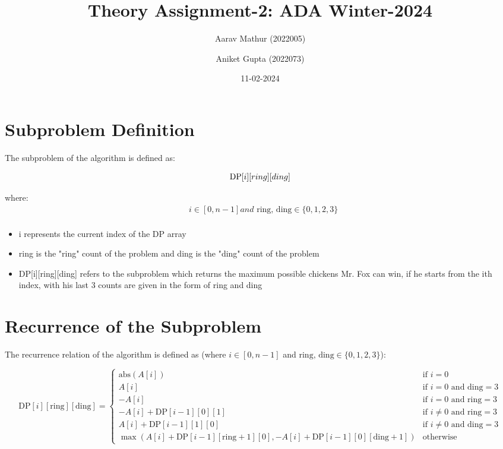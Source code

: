 \documentclass{article}
\title{Theory Assignment-2: ADA Winter-2024}
\author{Aarav Mathur (2022005) \and Aniket Gupta (2022073)}
\date{11-02-2024}
\begin{document}
\maketitle

\section{Subproblem Definition}

The subproblem of the algorithm is defined as:

\[
\text{{DP}}\text[i][ring][ding]
\]

where:
\begin{align*}
& i \in [0, n - 1] and \text{ ring, ding} \in \{0,1, 2, 3\} \\
\end{align*}

\begin{itemize}
    \item i represents the current index of the DP array
    \item ring is the "ring" count of the problem and ding is the "ding" count of the problem
    \item DP[i][ring][ding] refers to the subproblem which returns the maximum possible chickens Mr. Fox can win, if he starts from the ith index, with his last 3 counts are given in the form of ring and ding
\end{itemize}

\section{Recurrence of the Subproblem}

The recurrence relation of the algorithm is defined as (where $i \in [0, n - 1]$ and $\text{ring, ding} \in \{0,1, 2, 3\}$):

\[
\text{DP}[i][\text{ring}][\text{ding}] = \begin{cases} 
\text{abs}(A[i]) & \text{if } i = 0 \\
A[i] & \text{if } i = 0 \text{ and } \text{ding} = 3 \\
-A[i] & \text{if } i = 0 \text{ and } \text{ring} = 3 \\
-A[i] + \text{DP}[i - 1][0][1] & \text{if } i \neq 0  \text{ and } \text{ring} = 3  \\
A[i] + \text{DP}[i - 1][1][0] & \text{if } i \neq 0  \text{ and } \text{ding} = 3  \\
\max \left( A[i] + \text{DP}[i - 1][\text{ring} + 1][0], -A[i] + \text{DP}[i - 1][0][\text{ding} + 1] \right) & \text{otherwise}
\end{cases}
\]
\end{document}

